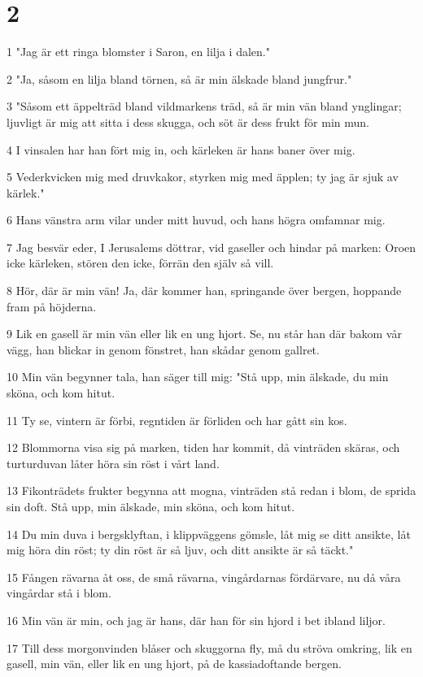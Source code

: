 \chapter{2}

\par 1 "Jag är ett ringa blomster i Saron, en lilja i dalen."
\par 2 "Ja, såsom en lilja bland törnen, så är min älskade bland jungfrur."
\par 3 "Såsom ett äppelträd bland vildmarkens träd, så är min vän bland ynglingar; ljuvligt är mig att sitta i dess skugga, och söt är dess frukt för min mun.
\par 4 I vinsalen har han fört mig in, och kärleken är hans baner över mig.
\par 5 Vederkvicken mig med druvkakor, styrken mig med äpplen; ty jag är sjuk av kärlek."
\par 6 Hans vänstra arm vilar under mitt huvud, och hans högra omfamnar mig.
\par 7 Jag besvär eder, I Jerusalems döttrar, vid gaseller och hindar på marken: Oroen icke kärleken, stören den icke, förrän den själv så vill.
\par 8 Hör, där är min vän! Ja, där kommer han, springande över bergen, hoppande fram på höjderna.
\par 9 Lik en gasell är min vän eller lik en ung hjort. Se, nu står han där bakom vår vägg, han blickar in genom fönstret, han skådar genom gallret.
\par 10 Min vän begynner tala, han säger till mig: "Stå upp, min älskade, du min sköna, och kom hitut.
\par 11 Ty se, vintern är förbi, regntiden är förliden och har gått sin kos.
\par 12 Blommorna visa sig på marken, tiden har kommit, då vinträden skäras, och turturduvan låter höra sin röst i vårt land.
\par 13 Fikonträdets frukter begynna att mogna, vinträden stå redan i blom, de sprida sin doft. Stå upp, min älskade, min sköna, och kom hitut.
\par 14 Du min duva i bergsklyftan, i klippväggens gömsle, låt mig se ditt ansikte, låt mig höra din röst; ty din röst är så ljuv, och ditt ansikte är så täckt."
\par 15 Fången rävarna åt oss, de små rävarna, vingårdarnas fördärvare, nu då våra vingårdar stå i blom.
\par 16 Min vän är min, och jag är hans, där han för sin hjord i bet ibland liljor.
\par 17 Till dess morgonvinden blåser och skuggorna fly, må du ströva omkring, lik en gasell, min vän, eller lik en ung hjort, på de kassiadoftande bergen.

